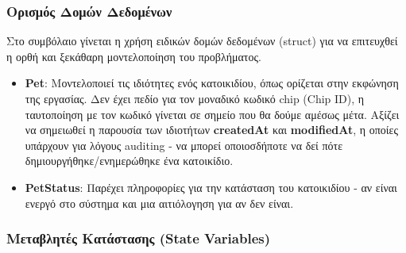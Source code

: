 \documentclass[12pt,a4paper]{article}
\begin{document}
\subsubsection{Ορισμός Δομών Δεδομένων}
Στο συμβόλαιο γίνεται η χρήση ειδικών δομών δεδομένων (struct) για να επιτευχθεί η ορθή και ξεκάθαρη μοντελοποίηση του προβλήματος.

\begin{itemize}
    \item \textbf{Pet}: Μοντελοποιεί τις ιδιότητες ενός κατοικιδίου, όπως ορίζεται στην εκφώνηση της εργασίας. Δεν έχει πεδίο για τον μοναδικό κωδικό chip (Chip ID), η ταυτοποίηση με τον κωδικό γίνεται σε σημείο που θα δούμε αμέσως μέτα. Αξίζει να σημειωθεί η παρουσία των ιδιοτήτων \textbf{createdAt} και \textbf{modifiedAt}, η οποίες υπάρχουν για λόγους auditing - να μπορεί οποιοσδήποτε να δεί πότε δημιουργήθηκε/ενημερώθηκε ένα κατοικίδιο.
    
    \item \textbf{PetStatus}: Παρέχει πληροφορίες για την κατάσταση του κατοικιδίου - αν είναι ενεργό στο σύστημα και μια αιτιόλογηση για αν δεν είναι.
\end{itemize}

\subsubsection{Μεταβλητές Κατάστασης (State Variables)}
\end{document}
